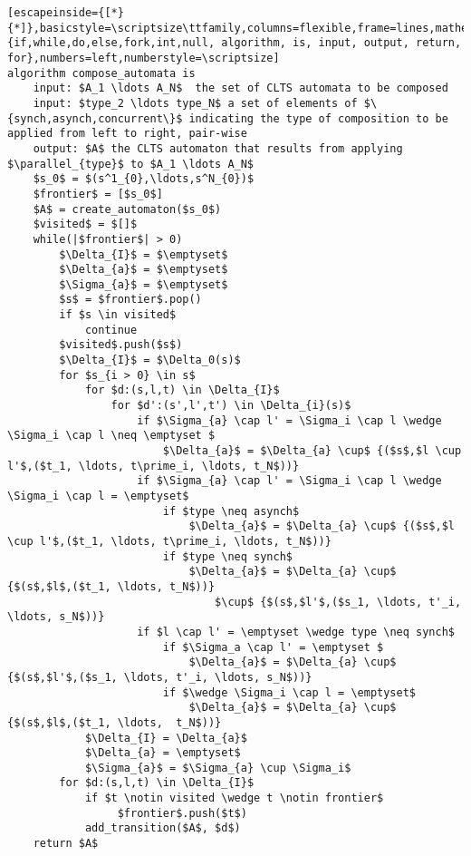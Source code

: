 \renewcommand{\ttdefault}{pcr}
\begin{lstlisting}[escapeinside={[*}{*]},basicstyle=\scriptsize\ttfamily,columns=flexible,frame=lines,mathescape=true,xleftmargin=3.0ex,keywordstyle=\textbf,morekeywords={if,while,do,else,fork,int,null, algorithm, is, input, output, return, for},numbers=left,numberstyle=\scriptsize]
algorithm compose_automata is
	input: $A_1 \ldots A_N$  the set of CLTS automata to be composed
	input: $type_2 \ldots type_N$ a set of elements of $\{synch,asynch,concurrent\}$ indicating the type of composition to be applied from left to right, pair-wise
	output: $A$ the CLTS automaton that results from applying $\parallel_{type}$ to $A_1 \ldots A_N$
	$s_0$ = $(s^1_{0},\ldots,s^N_{0})$
	$frontier$ = [$s_0$]
	$A$ = create_automaton($s_0$)
	$visited$ = $[]$
	while(|$frontier$| > 0)
		$\Delta_{I}$ = $\emptyset$
		$\Delta_{a}$ = $\emptyset$
		$\Sigma_{a}$ = $\emptyset$		
		$s$ = $frontier$.pop()
		if $s \in visited$
			continue
		$visited$.push($s$)
		$\Delta_{I}$ = $\Delta_0(s)$
		for $s_{i > 0} \in s$ 
			for $d:(s,l,t) \in \Delta_{I}$
				for $d':(s',l',t') \in \Delta_{i}(s)$
					if $\Sigma_{a} \cap l' = \Sigma_i \cap l \wedge \Sigma_i \cap l \neq \emptyset $
						$\Delta_{a}$ = $\Delta_{a} \cup$ {($s$,$l \cup l'$,($t_1, \ldots, t\prime_i, \ldots, t_N$))}
					if $\Sigma_{a} \cap l' = \Sigma_i \cap l \wedge \Sigma_i \cap l = \emptyset$
						if $type \neq asynch$
							$\Delta_{a}$ = $\Delta_{a} \cup$ {($s$,$l \cup l'$,($t_1, \ldots, t\prime_i, \ldots, t_N$))}
						if $type \neq synch$							
							$\Delta_{a}$ = $\Delta_{a} \cup$ {$(s$,$l$,($t_1, \ldots, t_N$))} 
								$\cup$ {$(s$,$l'$,($s_1, \ldots, t'_i, \ldots, s_N$))}
					if $l \cap l' = \emptyset \wedge type \neq synch$
						if $\Sigma_a \cap l' = \emptyset $
							$\Delta_{a}$ = $\Delta_{a} \cup$ {$(s$,$l'$,($s_1, \ldots, t'_i, \ldots, s_N$))} 
						if $\wedge \Sigma_i \cap l = \emptyset$
							$\Delta_{a}$ = $\Delta_{a} \cup$ {$(s$,$l$,($t_1, \ldots,  t_N$))} 							
			$\Delta_{I} = \Delta_{a}$						
			$\Delta_{a} = \emptyset$						
			$\Sigma_{a}$ = $\Sigma_{a} \cup \Sigma_i$
		for $d:(s,l,t) \in \Delta_{I}$
			if $t \notin visited \wedge t \notin frontier$ 
				 $frontier$.push($t$)
			add_transition($A$, $d$)			
	return $A$

\end{lstlisting}